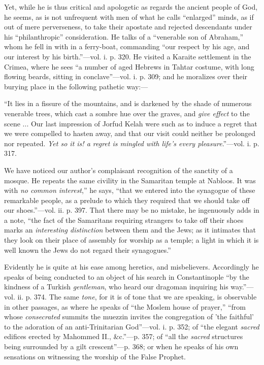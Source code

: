 Yet, while
he is thus critical and apologetic as regards the ancient people of God,
he seems, as is not unfrequent with men of what he calls ``enlarged''
minds, as if out of mere perverseness, to take their apostate and
rejected descendants under his ``philanthropic'' consideration. He talks
of a ``venerable son of Abraham,'' whom he fell in with in a ferry-boat,
commanding ``our respect by his age, and our interest by his birth.''—vol.
i. p. 320. He visited a Karaite settlement in the Crimea, where he sees ``a
number of aged Hebrews in Tahtar costume, with long flowing beards,
sitting in conclave''—vol. i. p. 309; and he moralizes over their
burying place in the following pathetic way:—

``It
lies in a fissure of the mountains, and is darkened by the shade of
numerous venerable trees, which cast a sombre hue over the graves, and \emph{give
effect} to the scene ... Our last impression of Jorfud Kelah were
such as to induce a regret that we were compelled to hasten away, and
that our visit could neither be prolonged nor repeated. \emph{Yet so it is!
a regret is mingled with life's every pleasure}.''—vol. i. p. 317.

We have
noticed our author's complaisant recognition of the sanctity of a
mosque. He repeats the same civility in the Samaritan temple at Nabloos.
It was with \emph{no common interest},'' he says, ``that we entered into
the synagogue of these remarkable people, as a prelude to which they
required that we should take off our shoes.''—vol. ii. p. 397. That
there may be no mistake, he ingenuously adds in a note, ``the fact of the
Samaritans requiring strangers to take off their shoes marks an \emph{interesting
distinction} between them and the Jews; as it intimates that they
look on their place of assembly for worship as a temple; a light in
which it is well known the Jews do not regard their synagogues.''

Evidently
he is quite at his ease among heretics, and misbelievers. Accordingly he speaks of being conducted to an object of his search in
Constantinople ``by the kindness of a Turkish \emph{gentleman}, who heard
our dragoman inquiring his way.''—vol. ii. p. 374. The same \emph{tone},
for it is of tone that we are speaking, is observable in other passages,
as where he speaks of ``the Moslem house of prayer,'' ``from whose \emph{consecrated}
summits the muezzin invites the congregation of 'the faithful' to the
adoration of an anti-Trinitarian God''—vol. i. p. 352; of ``the elegant \emph{sacred}
edifices erected by Mahommed II., \&c.''—p. 357; of ``all the \emph{sacred}
structures being surrounded by a gilt crescent''—p. 368; or when he
speaks of his own sensations on witnessing the worship of the False
Prophet.

